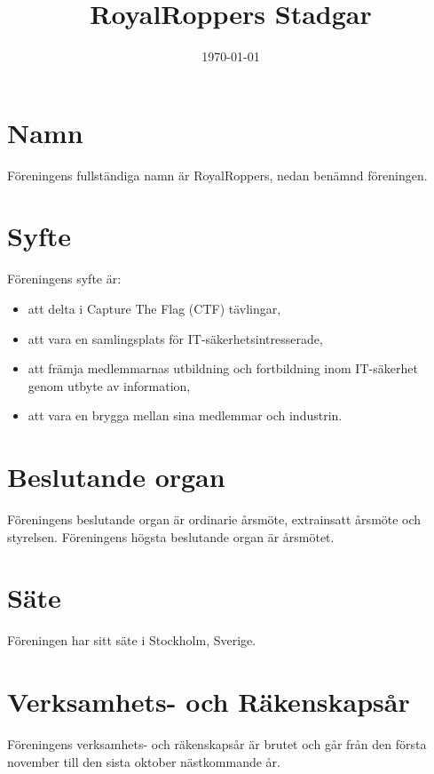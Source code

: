 \documentclass[a4paper,11pt]{article}
\title{RoyalRoppers Stadgar}
\date{\today}
\begin{document}
\maketitle
\newpage

\tableofcontents
\newpage

\section{Namn}
Föreningens fullständiga namn är RoyalRoppers, nedan benämnd föreningen.

\section{Syfte}
Föreningens syfte är:

\begin{itemize}
    \item att delta i Capture The Flag (CTF) tävlingar,
    \item att vara en samlingsplats för IT-säkerhetsintresserade,
    \item att främja medlemmarnas utbildning och fortbildning inom IT-säkerhet genom utbyte av information,
    \item att vara en brygga mellan sina medlemmar och industrin.
\end{itemize}

\section{Beslutande organ}
Föreningens beslutande organ är ordinarie årsmöte, extrainsatt årsmöte och styrelsen.
Föreningens högsta beslutande organ är årsmötet.

\section{Säte}
Föreningen har sitt säte i Stockholm, Sverige.

\section{Verksamhets- och Räkenskapsår}
Föreningens verksamhets- och räkenskapsår är brutet och går från den första november till den sista oktober nästkommande år.
\end{document}
